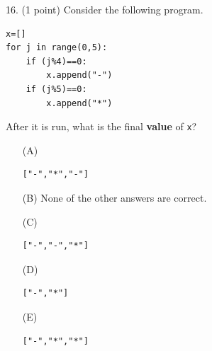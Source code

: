 \documentclass{article}
\begin{document}
\noindent
\begin{minipage}{\textwidth}
16. (1 point)
Consider the following program.
\begin{verbatim}
x=[]
for j in range(0,5):
    if (j%4)==0:
        x.append("-")
    if (j%5)==0:
        x.append("*")
\end{verbatim}
After it is run, what is the final \textbf{value} of \texttt{x}?

\begin{enumerate}
\item[(A)]
\begin{verbatim}["-","*","-"]\end{verbatim}

\item[(B)]
None of the other answers are correct.

\item[(C)]
\begin{verbatim}["-","-","*"]\end{verbatim}

\item[(D)]
\begin{verbatim}["-","*"]\end{verbatim}

\item[(E)]
\begin{verbatim}["-","*","*"]\end{verbatim}

\end{enumerate}
\end{minipage}
\vspace{2em}
\filbreak\vfil{}\vfilneg
\end{document}
